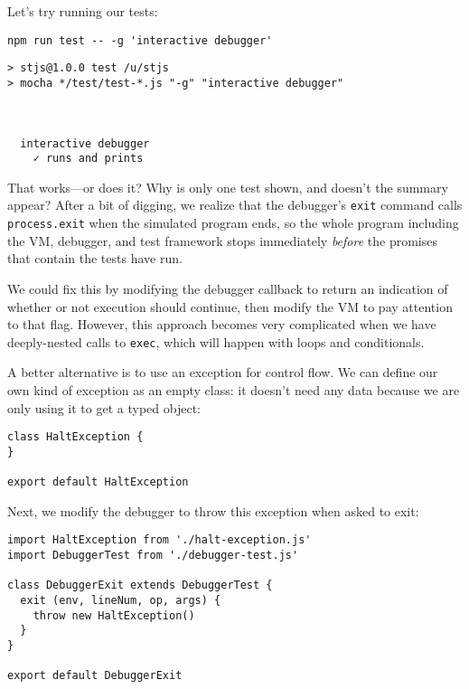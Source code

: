 \documentclass[krantzl]{krantz}
\begin{document}
Let’s try running our tests:


\begin{lstlisting}[frame=shadowbox]
npm run test -- -g 'interactive debugger'
\end{lstlisting}



\begin{lstlisting}[frame=tblr,backgroundcolor=\color{black!5}]
> stjs@1.0.0 test /u/stjs
> mocha */test/test-*.js "-g" "interactive debugger"



  interactive debugger
    ✓ runs and prints
\end{lstlisting}



That works—or does it?
Why is only one test shown,
and doesn’t the summary appear?
After a bit of digging,
we realize that the debugger’s \texttt{exit} command calls \texttt{process.exit} when the simulated program ends,
so the whole program including the VM, debugger, and test framework stops immediately
\emph{before} the promises that contain the tests have run.


We could fix this by modifying the debugger callback
to return an indication of whether or not execution should continue,
then modify the VM to pay attention to that flag.
However,
this approach becomes very complicated when we have deeply-nested calls to \texttt{exec},
which will happen with loops and conditionals.


A better alternative is to use an exception for control flow.
We can define our own kind of exception as an empty class:
it doesn’t need any data
because we are only using it to get a typed object:


\begin{lstlisting}[frame=tblr]
class HaltException {
}

export default HaltException
\end{lstlisting}



\noindent Next,
we modify the debugger to throw this exception when asked to exit:


\begin{lstlisting}[frame=tblr]
import HaltException from './halt-exception.js'
import DebuggerTest from './debugger-test.js'

class DebuggerExit extends DebuggerTest {
  exit (env, lineNum, op, args) {
    throw new HaltException()
  }
}

export default DebuggerExit
\end{lstlisting}
\end{document}
